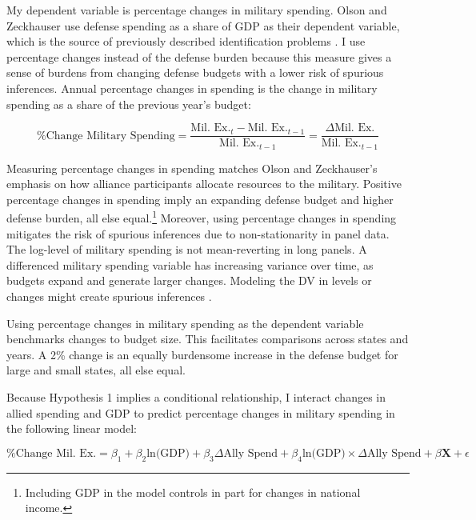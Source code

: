 \documentclass[12pt]{article}
\begin{document}
My dependent variable is percentage changes in military spending. 
Olson and Zeckhauser use defense spending as a share of GDP as their dependent variable, which is the source of previously described identification problems \citep{Kronmal1993, PluemperNeumayer2015}. 
I use percentage changes instead of the defense burden because this measure gives a sense of burdens from changing defense budgets with a lower risk of spurious inferences. 
Annual percentage changes in spending is the change in military spending as a share of the previous year's budget:


\begin{equation}
\mbox{\% Change Military Spending} = \frac{\mbox{Mil. Ex.}_t - \mbox{Mil. Ex.}_{t-1} }{ \mbox{Mil. Ex.}_{t-1} } = \frac{\Delta \mbox{Mil. Ex.} }{ \mbox{Mil. Ex.}_{t-1} }
\end{equation} 


Measuring percentage changes in spending matches Olson and Zeckhauser's emphasis on how alliance participants allocate resources to the military.
Positive percentage changes in spending imply an expanding defense budget and higher defense burden, all else equal.\footnote{Including GDP in the model controls in part for changes in national income.} 
Moreover, using percentage changes in spending mitigates the risk of spurious inferences due to non-stationarity in panel data. 
The log-level of military spending is not mean-reverting in long panels.
A differenced military spending variable has increasing variance over time, as budgets expand and generate larger changes. 
Modeling the DV in levels or changes might create spurious inferences \citep{GrangerNewbold1974}. 


Using percentage changes in military spending as the dependent variable benchmarks changes to budget size. 
This facilitates comparisons across states and years. 
A 2\% change is an equally burdensome increase in the defense budget for large and small states, all else equal. 


Because Hypothesis 1 implies a conditional relationship, I interact changes in allied spending and GDP to predict percentage changes in military spending in the following linear model:

\begin{equation} 
\mbox{\% Change Mil. Ex.} = \beta_1 + \beta_2 \mbox{ln(GDP)} + \beta_3 \Delta \mbox{Ally Spend} + \beta_4 \mbox{ln(GDP)} \times \Delta \mbox{Ally Spend} + \beta \mathbf{X} + \epsilon
\end{equation}
\end{document}
